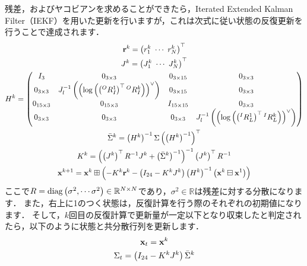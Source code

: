 残差，およびヤコビアンを求めることができたら，Iterated Extended Kalman Filter（IEKF）を用いた更新を行いますが，これは次式に従い状態の反復更新を行うことで達成されます．
%
\begin{align}
  \begin{gathered}
    {\bf r}^{k} = \left( r_{1}^{k} ~ \cdots ~ r_{N}^{k} \right)^{\top} \\
%
    J^{k} = \left( J_{1}^{k} ~ \cdots ~ J_{N}^{k} \right)^{\top} \\
%
    H^{k} = \left( \begin{matrix}
      I_{3} & 0_{3 \times 3} & 0_{3 \times 15} & 0_{3 \times 3} \\
%
      0_{3 \times 3} & J_{l}^{-1} \left( \left( \log \left( \left( {}^{O}R_{I}^{1} \right)^{\top} {}^{O}R_{I}^{k} \right) \right)^{\vee} \right) & 0_{3 \times 15} & 0_{3 \times 3} \\
%
      0_{15 \times 3} & 0_{15 \times 3} & I_{15 \times 15} & 0_{3 \times 3} \\
%
      0_{3 \times 3} & 0_{3 \times 3} & 0_{3 \times 3} & J_{l}^{-1} \left( \left( \log \left( \left( {}^{I}R_{L}^{1} \right)^{\top} {}^{I}R_{L}^{k} \right) \right)^{\vee} \right)
    \end{matrix} \right) \\
%
    \bar{ \Sigma }^{k} = \left( H^{k} \right)^{-1} \Sigma \left( \left( H^{k} \right)^{-1} \right)^{\top} \\
%
    K^{k} = \left( \left( J^{k} \right)^{\top} R^{-1} J^{k} + \left( \bar{ \Sigma }^{k} \right)^{-1} \right)^{-1} \left( J^{k} \right)^{\top} R^{-1} \\
%
    {\bf x}^{k+1} = {\bf x}^{k} \boxplus \left( -K^{k} {\bf r}^{k} - \left( I_{24} - K^{k} J^{k} \right) \left( H^{k} \right)^{-1} \left( {\bf x}^{k} \boxminus {\bf x}^{1} \right) \right)
  \end{gathered}
  \label{eq:iterated_extended_kalman_filter}
\end{align}
%
ここで$R = {\rm diag} \left( \sigma^{2}, \cdots \sigma^{2} \right) \in \mathbb{R}^{N \times N}$であり，$\sigma^{2} \in \mathbb{R}$は残差に対する分散になります．
また，右上に1のつく状態は，反復計算を行う際のそれぞれの初期値になります．
そして，$k$回目の反復計算で更新量が一定以下となり収束したと判定されたら，以下のように状態と共分散行列を更新します．
%
\begin{align}
  \begin{gathered}
    {\bf x}_{t} = {\bf x}^{k} \\
%
    \Sigma_{t} = \left( I_{24} - K^{k} J^{k} \right) \bar{ \Sigma }^{k}
  \end{gathered}
\end{align}























